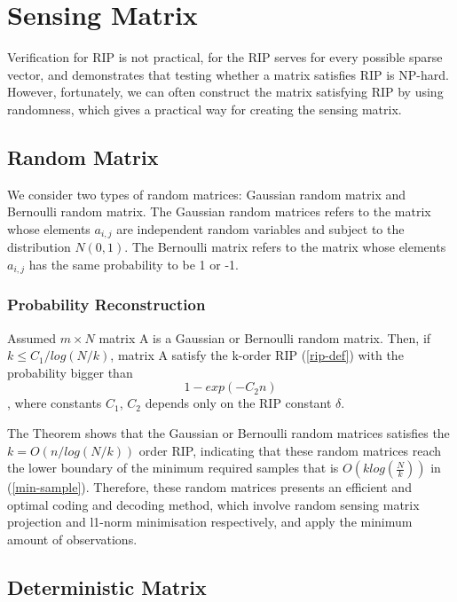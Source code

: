 \section{Sensing Matrix}

Verification for RIP is not practical, for the RIP serves for every possible sparse vector, and \cite{bandeira2012certifying} demonstrates that testing whether a matrix satisfies RIP is NP-hard. However, fortunately, we can often construct the matrix satisfying RIP by using randomness, which gives a practical way for creating the sensing matrix.

\subsection{Random Matrix}

We consider two types of random matrices: Gaussian random matrix and Bernoulli random matrix. The Gaussian random matrices refers to the matrix whose elements $a_{i, j}$ are independent random variables and subject to the distribution $N(0,1)$. The Bernoulli matrix refers to the matrix whose elements $a_{i, j}$ has the same probability to be 1 or -1.

\subsubsection{Probability Reconstruction}

\begin{theorem}
\label{prob-recon}
Assumed $m \times N$ matrix A is a Gaussian or Bernoulli random matrix. Then, if $k \leq C_1 / log (N / k)$, matrix A satisfy the k-order RIP (\ref{rip-def}) with the probability bigger than
\begin{equation}
1 - exp (- C_2 n)
\end{equation}
, where constants $C_1$, $C_2$ depends only on the RIP constant $\delta$.
\end{theorem}
The Theorem shows that the Gaussian or Bernoulli random matrices satisfies the $k = O(n/ log(N/k)) $ order RIP, indicating that these random matrices reach the lower boundary of the minimum required samples that is $O(k log(\frac{N}{k}))$ in (\ref{min-sample}). Therefore, these random matrices presents an efficient and optimal coding and decoding method, which involve random sensing matrix projection and l1-norm minimisation respectively, and apply the minimum amount of observations.

\subsection{Deterministic Matrix}

